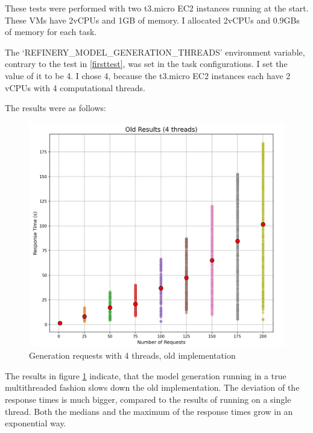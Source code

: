 				These tests were performed with two t3.micro EC2 instances running at the start. These VMs have 2vCPUs and 1GB of memory. I allocated
				2vCPUs and 0.9GBs of memory for each task. 

				The `REFINERY\_MODEL\_GENERATION\_THREADS' environment variable, contrary to the test in \ref{firsttest}, was set in the task configurations. 
				I set the value of it to be 4. I chose 4, because the t3.micro EC2 instances each have 2 vCPUs with 4 computational threads.

				The results were as follows:

				\begin{figure}[h!] 
					\begin{center}
						\includegraphics[scale=0.6]{include/imgs/4threads_old.PNG}
						\caption{Generation requests with 4 threads, old implementation}
						\label{4threadsold}	
					\end{center}
				\end{figure}

				The results in figure \ref{4threadsold} indicate, that the model generation running in a true multithreaded fashion slows down the old implementation. The 
				deviation of the response times is much bigger, compared to the results of running on a single thread. Both the medians and the maximum of the response times
				grow in an exponential way.

